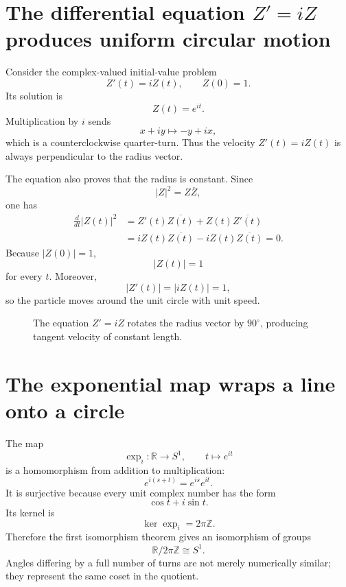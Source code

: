 
\section{The differential equation \texorpdfstring{$Z'=iZ$}{Z'=iZ} produces uniform circular motion}

Consider the complex-valued initial-value problem
\[
  Z'(t)=iZ(t),
  \qquad
  Z(0)=1.
\]
Its solution is
\[
  Z(t)=e^{it}.
\]
Multiplication by \(i\) sends
\[
  x+iy\longmapsto-y+ix,
\]
which is a counterclockwise quarter-turn.  Thus the velocity \(Z'(t)=iZ(t)\) is always perpendicular to the radius vector.

The equation also proves that the radius is constant.  Since
\[
  |Z|^2=Z\overline Z,
\]
one has
\[
\begin{aligned}
  \frac d{dt}|Z(t)|^2
  &=Z'(t)\overline{Z(t)}
    +Z(t)\overline{Z'(t)}\\
  &=iZ(t)\overline{Z(t)}
    -iZ(t)\overline{Z(t)}=0.
\end{aligned}
\]
Because \(|Z(0)|=1\),
\[
  |Z(t)|=1
\]
for every \(t\).  Moreover,
\[
  |Z'(t)|=|iZ(t)|=1,
\]
so the particle moves around the unit circle with unit speed.

\begin{figure}[H]
\centering
{}
\caption{The equation \(Z'=iZ\) rotates the radius vector by \(90^\circ\), producing tangent velocity of constant length.}
\end{figure}

\section{The exponential map wraps a line onto a circle}

The map
\[
  \exp_i:\mathbb R\longrightarrow S^1,
  \qquad
  t\longmapsto e^{it}
\]
is a homomorphism from addition to multiplication:
\[
  e^{i(s+t)}=e^{is}e^{it}.
\]
It is surjective because every unit complex number has the form
\[
  \cos t+i\sin t.
\]
Its kernel is
\[
  \ker\exp_i=2\pi\mathbb Z.
\]
Therefore the first isomorphism theorem gives an isomorphism of groups
\[
  \boxed{
  \mathbb R/2\pi\mathbb Z\cong S^1.}
\]
Angles differing by a full number of turns are not merely numerically similar; they represent the same coset in the quotient.

